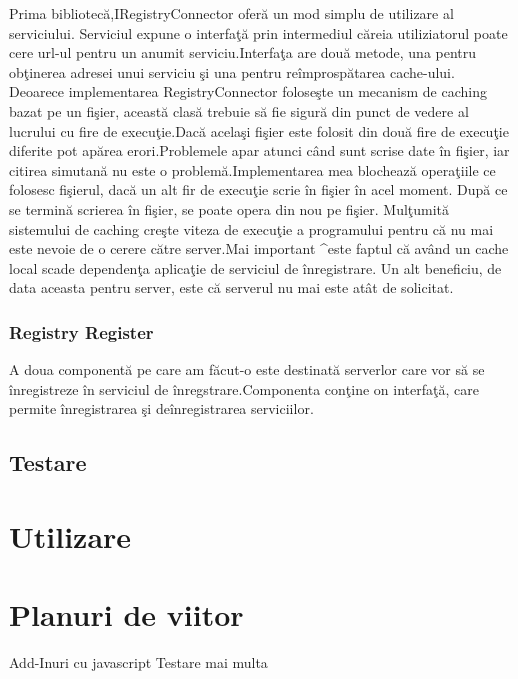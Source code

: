 \documentclass[a4paper,12pt]{report}
\begin{document}
Prima bibliotec\u a,IRegistryConnector ofer\u a un mod simplu de utilizare al serviciului.
Serviciul expune o interfa\c t\u a prin intermediul c\u areia utiliziatorul poate
cere url-ul pentru un anumit serviciu.Interfa\c ta are dou\u a metode, una pentru ob\c tinerea
adresei unui serviciu \c si una pentru re\^improsp\u atarea cache-ului.
Deoarece implementarea RegistryConnector folose\c ste un mecanism de caching bazat pe un fi\c sier,
aceast\u a clas\u a trebuie s\u a fie sigur\u a din punct de vedere al lucrului
cu fire de execu\c tie.Dac\u a acela\c si fi\c sier este folosit din dou\u a fire de execu\c tie 
diferite pot ap\u area erori.Problemele apar atunci c\^and sunt scrise date \^in fi\c sier,
iar citirea simutan\u a nu este o problem\u a.Implementarea mea blocheaz\u a opera\c tiile 
ce folosesc fi\c sierul, dac\u a un alt fir de execu\c tie scrie \^in fi\c sier \^in acel moment.
Dup\u a ce se termin\u a scrierea \^in fi\c sier, se poate opera din nou pe fi\c sier.
Mul\c tumit\u a sistemului de caching cre\c ste viteza de execu\c tie a programului pentru
c\u a nu mai este nevoie de o cerere c\u atre server.Mai important ^este faptul c\u a
av\^and un cache local scade dependen\c ta aplica\c tie de serviciul de \^inregistrare.
Un alt beneficiu, de data aceasta pentru server, este c\u a serverul nu mai este at\^at de 
solicitat.

\subsection{Registry Register}

A doua component\u a pe care am f\u acut-o este destinat\u a serverlor care vor s\u a se 
\^inregistreze \^in serviciul de \^inregstrare.Componenta con\c tine on interfa\c t\u a,
care permite \^inregistrarea \c si de\^inregistrarea serviciilor.


\section{Testare}


\chapter{Utilizare}



\chapter{Planuri de viitor}

Add-Inuri cu javascript
Testare mai multa

\printbibliography
\end{document}
